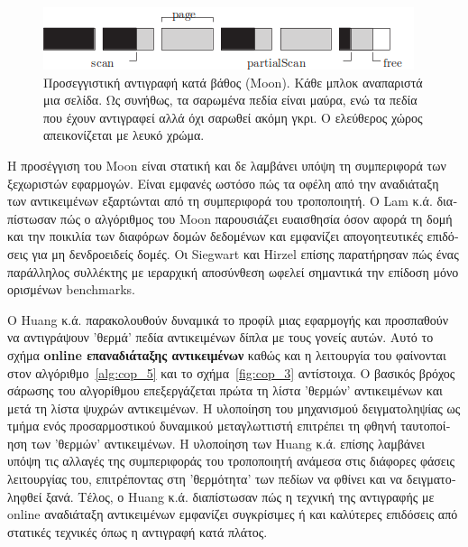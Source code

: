 \begin{greek}
\begin{figure}
  \centering
  \includegraphics{figures/cop_4}
  \caption[Προσεγγιστική αντιγραφή κατά βάθος (Moon)]
   {Προσεγγιστική αντιγραφή κατά βάθος (Moon). Κάθε μπλοκ αναπαριστά
    μια σελίδα. Ως συνήθως, τα σαρωμένα πεδία είναι μαύρα, ενώ
    τα πεδία που έχουν αντιγραφεί αλλά όχι σαρωθεί ακόμη γκρι.
    Ο ελεύθερος χώρος απεικονίζεται με λευκό χρώμα.}
  \label{fig:cop_4}
\end{figure}

Η προσέγγιση του Moon είναι στατική και δε λαμβάνει υπόψη τη
συμπεριφορά των ξεχωριστών εφαρμογών. Είναι εμφανές ωστόσο πώς
τα οφέλη από την αναδιάταξη των αντικειμένων εξαρτώνται από τη
συμπεριφορά του τροποποιητή. Ο Lam κ.ά. \cite{DBLP:conf/iwmm/LamWM92}
διαπίστωσαν πώς ο αλγόριθμος του Moon παρουσιάζει ευαισθησία
όσον αφορά τη δομή και την ποικιλία των διαφόρων δομών δεδομένων
και εμφανίζει απογοητευτικές επιδόσεις για μη δενδροειδείς
δομές. Οι Siegwart και Hirzel \cite{DBLP:conf/iwmm/SiegwartH06}
επίσης παρατήρησαν πώς ένας παράλληλος συλλέκτης με ιεραρχική
αποσύνθεση ωφελεί σημαντικά την επίδοση μόνο ορισμένων benchmarks.

O Huang κ.ά. \cite{DBLP:conf/oopsla/HuangBMMWC04} παρακολουθούν
δυναμικά το προφίλ μιας εφαρμογής και προσπαθούν να αντιγράψουν
'θερμά' πεδία αντικειμένων δίπλα με τους γονείς αυτών. Αυτό το
σχήμα \textbf{online επαναδιάταξης αντικειμένων} καθώς και η
λειτουργία του φαίνονται στον αλγόριθμο~\ref{alg:cop_5} και το
σχήμα~\ref{fig:cop_3} αντίστοιχα. Ο βασικός βρόχος σάρωσης του
αλγορίθμου επεξεργάζεται πρώτα τη λίστα 'θερμών' αντικειμένων
και μετά τη λίστα ψυχρών αντικειμένων. Η υλοποίηση του μηχανισμού
δειγματοληψίας ως τμήμα ενός προσαρμοστικού δυναμικού μεταγλωττιστή
επιτρέπει τη φθηνή ταυτοποίηση των 'θερμών' αντικειμένων. Η υλοποίηση
των Huang κ.ά. επίσης λαμβάνει υπόψη τις αλλαγές της συμπεριφοράς
του τροποποιητή ανάμεσα στις διάφορες φάσεις λειτουργίας του,
επιτρέποντας στη 'θερμότητα' των πεδίων να φθίνει και να δειγματοληφθεί
ξανά. Τέλος, ο Huang κ.ά. διαπίστωσαν πώς η τεχνική της αντιγραφής
με online αναδιάταξη αντικειμένων εμφανίζει συγκρίσιμες ή και
καλύτερες επιδόσεις από στατικές τεχνικές όπως η αντιγραφή κατά
πλάτος.


\end{greek}

